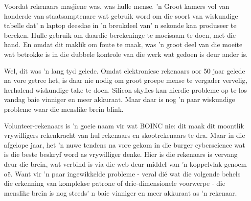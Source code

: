 % 
% 
Voordat rekenaars masjiene was, was hulle mense. 'n Groot kamers vol van honderde van staatsamptenare wat gebruik word om die soort van wiskundige tabelle dat' n laptop deesdae in 'n breukdeel van' n sekonde kan produseer te bereken. Hulle gebruik om daardie berekeninge te moeisaam te doen, met die hand. En omdat dit maklik om foute te maak, was 'n groot deel van die moeite wat betrokke is in die dubbele kontrole van die werk wat gedoen is deur ander is. \par
Wel, dit was 'n lang tyd gelede. Omdat elektroniese rekenaars oor 50 jaar gelede na vore getree het, is daar nie nodig om groot groepe mense te vergader vervelig, herhalend wiskundige take te doen. Silicon skyfies kan hierdie probleme op te los vandag baie vinniger en meer akkuraat. Maar daar is nog 'n paar wiskundige probleme waar die menslike brein blink. \par
Volunteer-rekenaars is 'n goeie naam vir wat BOINC nie: dit maak dit moontlik vrywilligers rekenkracht van hul rekenaars en skootrekenaars te dra. Maar in die afgelope jaar, het 'n nuwe tendens na vore gekom in die burger cyberscience wat is die beste beskryf word as vrywilliger denke. Hier is die rekenaars is vervang deur die brein, wat verbind is via die web deur middel van 'n koppelvlak genoem oë. Want vir 'n paar ingewikkelde probleme - veral dié wat die volgende behels die erkenning van komplekse patrone of drie-dimensionele voorwerpe - die menslike brein is nog steeds' n baie vinniger en meer akkuraat as 'n rekenaar. \par
